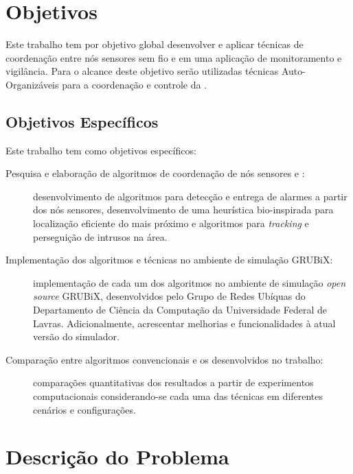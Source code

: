 \section{Objetivos}

Este trabalho tem por objetivo global desenvolver e aplicar técnicas de coordenação entre nós sensores sem fio e \uavs em uma aplicação de monitoramento e vigilância. Para o alcance deste objetivo serão utilizadas técnicas Auto-Organizáveis para a coordenação e controle da \rssf.

\subsection{Objetivos Específicos}

Este trabalho tem como objetivos específicos:

\begin{description}

	\item [Pesquisa e elaboração de algoritmos de coordenação de nós sensores e \vants:] desenvolvimento de algoritmos para detecção e entrega de alarmes a partir dos nós sensores, desenvolvimento de uma heurística bio-inspirada para localização eficiente do \uav mais próximo e algoritmos para \emph{tracking} e perseguição de intrusos na área.

	\item [Implementação dos algoritmos e técnicas no ambiente de simulação GRUBiX:] implementação de cada um dos algoritmos no ambiente de simulação \emph{open source} GRUBiX, desenvolvidos pelo Grupo de Redes Ubíquas do Departamento de Ciência da Computação da Universidade Federal de Lavras. Adicionalmente, acrescentar melhorias e funcionalidades à atual versão do simulador.

	\item [Comparação entre algoritmos convencionais e os desenvolvidos no trabalho:] comparações quantitativas dos resultados a partir de experimentos computacionais considerando-se cada uma das técnicas em diferentes cenários e configurações.

\end{description}


\section{Descrição do Problema}

